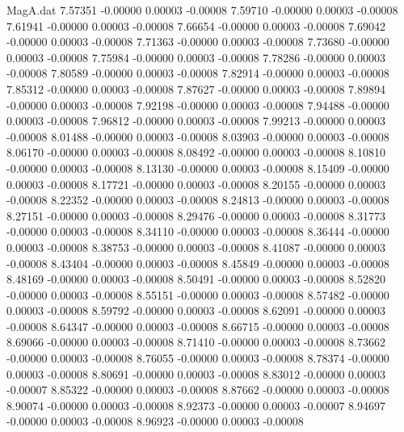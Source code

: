 \begin{filecontents}{MagA.dat}
   7.57351   -0.00000    0.00003   -0.00008
   7.59710   -0.00000    0.00003   -0.00008
   7.61941   -0.00000    0.00003   -0.00008
   7.66654   -0.00000    0.00003   -0.00008
   7.69042   -0.00000    0.00003   -0.00008
   7.71363   -0.00000    0.00003   -0.00008
   7.73680   -0.00000    0.00003   -0.00008
   7.75984   -0.00000    0.00003   -0.00008
   7.78286   -0.00000    0.00003   -0.00008
   7.80589   -0.00000    0.00003   -0.00008
   7.82914   -0.00000    0.00003   -0.00008
   7.85312   -0.00000    0.00003   -0.00008
   7.87627   -0.00000    0.00003   -0.00008
   7.89894   -0.00000    0.00003   -0.00008
   7.92198   -0.00000    0.00003   -0.00008
   7.94488   -0.00000    0.00003   -0.00008
   7.96812   -0.00000    0.00003   -0.00008
   7.99213   -0.00000    0.00003   -0.00008
   8.01488   -0.00000    0.00003   -0.00008
   8.03903   -0.00000    0.00003   -0.00008
   8.06170   -0.00000    0.00003   -0.00008
   8.08492   -0.00000    0.00003   -0.00008
   8.10810   -0.00000    0.00003   -0.00008
   8.13130   -0.00000    0.00003   -0.00008
   8.15409   -0.00000    0.00003   -0.00008
   8.17721   -0.00000    0.00003   -0.00008
   8.20155   -0.00000    0.00003   -0.00008
   8.22352   -0.00000    0.00003   -0.00008
   8.24813   -0.00000    0.00003   -0.00008
   8.27151   -0.00000    0.00003   -0.00008
   8.29476   -0.00000    0.00003   -0.00008
   8.31773   -0.00000    0.00003   -0.00008
   8.34110   -0.00000    0.00003   -0.00008
   8.36444   -0.00000    0.00003   -0.00008
   8.38753   -0.00000    0.00003   -0.00008
   8.41087   -0.00000    0.00003   -0.00008
   8.43404   -0.00000    0.00003   -0.00008
   8.45849   -0.00000    0.00003   -0.00008
   8.48169   -0.00000    0.00003   -0.00008
   8.50491   -0.00000    0.00003   -0.00008
   8.52820   -0.00000    0.00003   -0.00008
   8.55151   -0.00000    0.00003   -0.00008
   8.57482   -0.00000    0.00003   -0.00008
   8.59792   -0.00000    0.00003   -0.00008
   8.62091   -0.00000    0.00003   -0.00008
   8.64347   -0.00000    0.00003   -0.00008
   8.66715   -0.00000    0.00003   -0.00008
   8.69066   -0.00000    0.00003   -0.00008
   8.71410   -0.00000    0.00003   -0.00008
   8.73662   -0.00000    0.00003   -0.00008
   8.76055   -0.00000    0.00003   -0.00008
   8.78374   -0.00000    0.00003   -0.00008
   8.80691   -0.00000    0.00003   -0.00008
   8.83012   -0.00000    0.00003   -0.00007
   8.85322   -0.00000    0.00003   -0.00008
   8.87662   -0.00000    0.00003   -0.00008
   8.90074   -0.00000    0.00003   -0.00008
   8.92373   -0.00000    0.00003   -0.00007
   8.94697   -0.00000    0.00003   -0.00008
   8.96923   -0.00000    0.00003   -0.00008

\end{filecontents}
